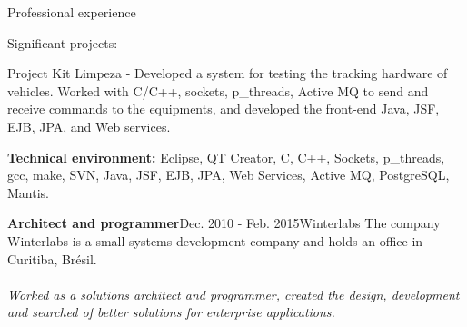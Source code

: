 \documentclass{resume}
\begin{document}
\begin{rSection}{Professional experience}
      \begin{rSubsection}{\fontsize{9}{10}\selectfont Significant projects:}{}{}{}
        \item Project Kit Limpeza - Developed a system for testing the tracking hardware of vehicles. Worked with C/C++, sockets, p\_threads, Active MQ to send and receive commands to the equipments, and developed the front-end Java, JSF, EJB, JPA, and Web services.
      \end{rSubsection}

      {\fontsize{8}{9}\selectfont \textbf{Technical environment:} Eclipse, QT Creator, C, C++, Sockets, p\_threads, gcc, make, SVN, Java, JSF, EJB, JPA, Web Services, Active MQ, PostgreSQL, Mantis.}\\

    \begin{rSubsection}{\fontsize{12}{14}\selectfont \bf Architect and programmer}{\fontsize{12}{14}\selectfont Dec. 2010 - Feb. 2015}{\fontsize{12}{14}\selectfont Winterlabs}{}
    The company Winterlabs is a small systems development company and holds an office in Curitiba, Brésil. \\\\
\textit{Worked as a solutions architect and programmer, created the design, development and searched of better solutions for enterprise applications.}
    \end{rSubsection}


\end{rSection}
\end{document}
